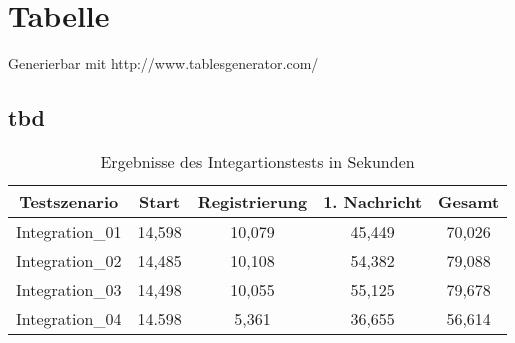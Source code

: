 
\chapter{Tabelle}

Generierbar mit http://www.tablesgenerator.com/

\section{tbd} 

\begin{table}[h]
\centering
\caption{Ergebnisse des Integartionstests in Sekunden}
\label{tab:integration}
\begin{tabular}{@{}ccccc@{}}
\toprule
Testszenario    & Start  & Registrierung & 1. Nachricht & \textbf{Gesamt} \\ \midrule
Integration\_01 & 14,598 & 10,079        & 45,449       & 70,026        \\
Integration\_02 & 14,485 & 10,108        & 54,382       & 79,088        \\
Integration\_03 & 14,498 & 10,055        & 55,125       & 79,678        \\
Integration\_04 & 14.598 & 5,361         & 36,655       & 56,614          \\ \bottomrule
\end{tabular}
\end{table}